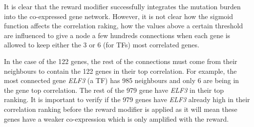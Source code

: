 
It is clear that the reward modifier successfully integrates the mutation burden into the co-expressed gene network. However, it is not clear how the sigmoid function affects the correlation raking, how the values above a certain threshold are influenced to give a node a few hundreds connections when each gene is allowed to keep either the 3 or 6 (for TFs) most correlated genes.

In the case of the 122 genes, the rest of the connections must come from their neighbours to contain the 122 genes in their top correlation. For example, the most connected gene \textit{ELF3} (a TF) has 985 neighbours and only 6 are being in the gene top correlation. The rest of the 979 gene have \textit{ELF3} in their top ranking. It is important to verify if the 979 genes have \textit{ELF3} already high in their correlation ranking before the reward modifier is applied as it will mean these genes have a weaker co-expression which is only amplified with the reward.

